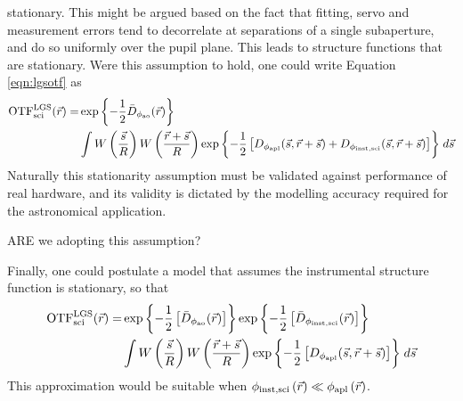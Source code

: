 stationary.  This might be argued based on the fact that fitting,
servo and measurement errors tend to decorrelate at separations of a
single subaperture, and do so uniformly over the pupil plane.  This
leads to structure functions that are stationary.  Were this
assumption to hold, one could write Equation \ref{eqn:lgsotf} as
\begin{equation}\label{eqn:lgsotfb}
\begin{aligned}
{\rm OTF}^{\rm LGS}_{\rm sci}(\vec{r}) = 
& \exp{
\left\{ -\frac{1}{2} \bar{D}_{\rm \phi_{\rm ao}}(\vec{r}) \right\}}  \\
& \int 
W \left( \frac{\vec{s}}{R} \right)
W \left( \frac{\vec{r} + \vec{s}}{R} \right)
\exp{ \left\{ -\frac{1}{2} \left[
D_{\rm \phi_{apl}}(\vec{s}, \vec{r} + \vec{s}) +
D_{\rm \phi_{inst,sci}}(\vec{s}, \vec{r} + \vec{s})
\right] \right\} }
\; d\vec{s} 
\end{aligned}
\end{equation}
Naturally this stationarity assumption must be validated against
performance of real hardware, and its validity is dictated by the
modelling accuracy required for the astronomical application.  
\begin{notes}
ARE we adopting this assumption? 
\end{notes}

Finally, one could postulate a model that assumes the instrumental
structure function is stationary, so that
\begin{equation}\label{eqn:lgsotfc}
\begin{aligned}
{\rm OTF}^{\rm LGS}_{\rm sci}(\vec{r}) = 
& \exp{ \left\{ -\frac{1}{2}
\left[ \bar{D}_{\rm \phi_{\rm ao}}(\vec{r}) \right] \right\} } 
\exp{ \left\{ -\frac{1}{2}
\left[ \bar{D}_{\rm \phi_{\rm inst,sci}}(\vec{r}) \right] \right\} }  \\
& \int 
W \left( \frac{\vec{s}}{R} \right)
W \left( \frac{\vec{r} + \vec{s}}{R} \right)
\exp{ \left\{ -\frac{1}{2} \left[
D_{\rm \phi_{apl}}(\vec{s},\vec{r} + \vec{s})
\right] \right\} }
\; d\vec{s} 
\end{aligned}
\end{equation}
This approximation would be suitable when 
$\phi_{\rm inst,sci} \left( \vec{r} \right) \ll 
\phi_{\rm apl} \left( \vec{r} \right)$.

